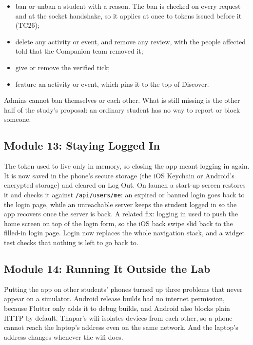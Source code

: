 \documentclass{tietreport}
\begin{document}
\begin{itemize}[nosep]
  \item ban or unban a student with a reason. The ban is checked on every request and at
        the socket handshake, so it applies at once to tokens issued before it (TC26);
  \item delete any activity or event, and remove any review, with the people affected told
        that the Companion team removed it;
  \item give or remove the verified tick;
  \item feature an activity or event, which pins it to the top of Discover.
\end{itemize}

\noindent Admins cannot ban themselves or each other. What is still missing is the other half
of the study's proposal: an ordinary student has no way to report or block someone.

\subsection{Module 13: Staying Logged In}

The token used to live only in memory, so closing the app meant logging in again. It is now
saved in the phone's secure storage (the iOS Keychain or Android's encrypted storage) and
cleared on Log Out. On launch a start-up screen restores it and checks it against
\texttt{/api/users/me}: an expired or banned login goes back to the login page, while an
unreachable server keeps the student logged in so the app recovers once the server is back.
A related fix: logging in used to push the home screen on top of the login form, so the iOS
back swipe slid back to the filled-in login page. Login now replaces the whole navigation
stack, and a widget test checks that nothing is left to go back to.

\subsection{Module 14: Running It Outside the Lab}

Putting the app on other students' phones turned up three problems that never appear on a
simulator. Android release builds had no internet permission, because Flutter only adds it
to debug builds, and Android also blocks plain HTTP by default. Thapar's wifi isolates
devices from each other, so a phone cannot reach the laptop's address even on the same
network. And the laptop's address changes whenever the wifi does.
\end{document}
